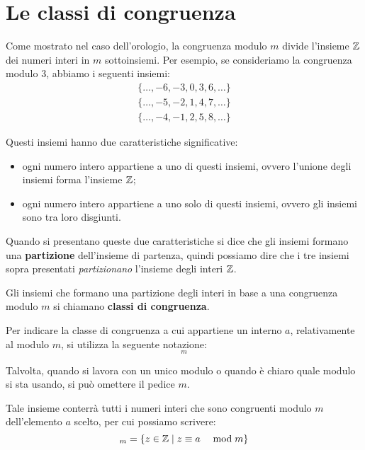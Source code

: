 \section{Le classi di congruenza}
\label{sec:classi_di_congruenza}

Come mostrato nel caso dell'orologio, la congruenza modulo $m$ divide l'insieme $ \mathbb{Z} $ dei numeri interi in $m$ sottoinsiemi.
Per esempio, se consideriamo la congruenza modulo 3, abbiamo i seguenti insiemi:
\begin{gather*}
    \{\dots, -6, -3, 0, 3, 6, \dots\} \\
    \{\dots, -5, -2, 1, 4, 7, \dots\} \\
    \{\dots, -4, -1, 2, 5, 8, \dots\}
\end{gather*}

Questi insiemi hanno due caratteristiche significative:
\begin{itemize}
    \item ogni numero intero appartiene a uno di questi insiemi, ovvero l'unione degli insiemi forma l'insieme $ \mathbb{Z} $;
    \item ogni numero intero appartiene a uno solo di questi insiemi, ovvero gli insiemi sono tra loro disgiunti.
\end{itemize}

Quando si presentano queste due caratteristiche si dice che gli insiemi formano una \textbf{partizione} dell'insieme di partenza, quindi possiamo dire che i tre insiemi sopra presentati \emph{partizionano} l'insieme degli interi $ \mathbb{Z} $.

\begin{definizione}
    Gli insiemi che formano una partizione degli interi in base a una congruenza modulo $m$ si chiamano \textbf{classi di congruenza}.
\end{definizione}

Per indicare la classe di congruenza a cui appartiene un interno $a$, relativamente al modulo $m$, si utilizza la seguente notazione:
\begin{equation*}
    [a]_m
\end{equation*}

Talvolta, quando si lavora con un unico modulo o quando è chiaro quale modulo si sta usando, si può omettere il pedice $m$.

Tale insieme conterrà tutti i numeri interi che sono congruenti modulo $m$ dell'elemento $a$ scelto, per cui possiamo scrivere:
\begin{equation*}
    [a]_m = \{z \in \Z \mid \congruenti{z}{a}{m}\}
\end{equation*}

